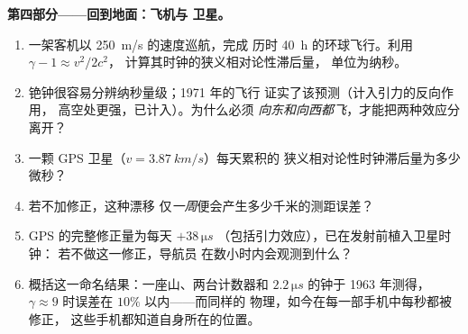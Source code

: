 \begin{problem}
\medskip\noindent\textbf{第四部分——回到地面：飞机与
卫星。}
\begin{enumerate}[resume]
  \item 一架客机以 \qty{250}{m/s} 的速度巡航，完成
        历时 \qty{40}{h} 的环球飞行。利用 $\gamma - 1 \approx v^2/2c^2$，
        计算其时钟的狭义相对论性滞后量，
        单位为纳秒。
  \item 铯钟很容易分辨纳秒量级；1971 年的飞行
        证实了该预测（计入引力的反向作用，
        高空处更强，已计入）。为什么必须
        \emph{向东和向西都飞}，才能把两种效应分离开？
  \item 一颗 GPS 卫星（$v = \qty{3.87}{km/s}$）每天累积的
        狭义相对论性时钟滞后量为多少微秒？
  \item 若不加修正，这种漂移
        仅\emph{一周}便会产生多少千米的测距误差？
  \item GPS 的完整修正量为每天 $+38\,\unit{\micro s}$
        （包括引力效应），已在发射前植入卫星时钟：
        若不做这一修正，导航员
        在数小时内会观测到什么？
  \item 概括这一命名结果：一座山、两台计数器和
        $2.2\,\unit{\micro s}$ 的钟于 1963 年测得，
        $\gamma \approx 9$ 时误差在 $10\%$ 以内——而同样的
        物理，如今在每一部手机中每秒都被修正，
        这些手机都知道自身所在的位置。
\end{enumerate}
\end{problem}
